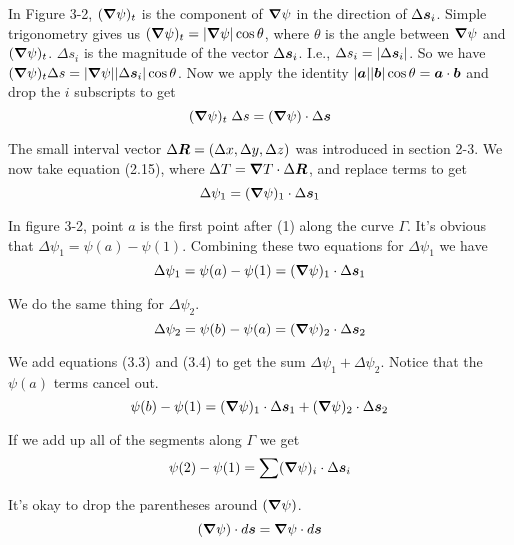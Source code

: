 In Figure 3-2, 
$(\boldsymbol{\nabla}\psi)_t$ is the component of $\boldsymbol{\nabla}\psi$ in the direction of $\Delta \boldsymbol{s}_i$.
Simple trigonometry gives us $(\boldsymbol{\nabla}\psi)_t = |\boldsymbol{\nabla}\psi| \cos \theta$,
where $\theta$ is the angle between $\boldsymbol{\nabla}\psi$ and $(\boldsymbol{\nabla}\psi)_t$.
$\Delta s_i$ is the magnitude of the vector $\Delta \boldsymbol{s}_i$.
I.e., $\Delta s_i = |\Delta \boldsymbol{s}_i|$.
So we have $(\boldsymbol{\nabla}\psi)_t \Delta s = |\boldsymbol{\nabla}\psi| |\Delta \boldsymbol{s}_i| \cos \theta$.
Now we apply the identity $|\boldsymbol{a}||\boldsymbol{b}|\cos\theta=\boldsymbol{a}\cdot\boldsymbol{b}$ 
and drop the $i$ subscripts to get
\begin{equation}
  (\boldsymbol{\nabla} \psi)_t \; \Delta s = (\boldsymbol{\nabla} \psi) \cdot \Delta \boldsymbol{s}
\end{equation}

The small interval vector $\Delta \boldsymbol{R} = (\Delta x, \Delta y, \Delta z)$
was introduced in section 2-3.  We now take equation (2.15), where
$\Delta T = \boldsymbol{\nabla} T \cdot \Delta \boldsymbol{R}$, and replace terms to get 
\begin{equation*}
  \Delta \psi_1 = (\boldsymbol{\nabla} \psi)_1 \cdot \Delta \boldsymbol{s}_1
\end{equation*}

In figure 3-2, point $a$ is the first point after (1) along the curve $\Gamma$.
It's obvious that $\Delta \psi_1 = \psi(a) - \psi(1)$.
Combining these two equations for $\Delta \psi_1$ we have
\begin{equation}
  \Delta \psi_1 = \psi(a) - \psi(1) = (\boldsymbol{\nabla} \psi)_1 \cdot \Delta \boldsymbol{s}_1
\end{equation}

We do the same thing for $\Delta \psi_2$.
\begin{equation}
  \Delta \psi_2 = \psi(b) - \psi(a) = (\boldsymbol{\nabla} \psi)_2 \cdot \Delta \boldsymbol{s}_2
\end{equation}

We add equations (3.3) and (3.4) to get the sum $\Delta \psi_1 + \Delta \psi_2$.
Notice that the $\psi(a)$ terms cancel out.
\begin{equation}
  \psi(b) - \psi(1) = (\boldsymbol{\nabla} \psi)_1 \cdot \Delta \boldsymbol{s}_1 + (\boldsymbol{\nabla} \psi)_2 \cdot \Delta \boldsymbol{s}_2
\end{equation}

If we add up all of the segments along $\Gamma$ we get
\begin{equation}
  \psi(2) - \psi(1) = \sum (\boldsymbol{\nabla} \psi)_i \cdot \Delta \boldsymbol{s}_i
\end{equation}

It's okay to drop the parentheses around $(\boldsymbol{\nabla}\psi)$.
\begin{equation}
  (\boldsymbol{\nabla} \psi) \cdot d\boldsymbol{s} = \boldsymbol{\nabla} \psi \cdot d\boldsymbol{s}
\end{equation}

